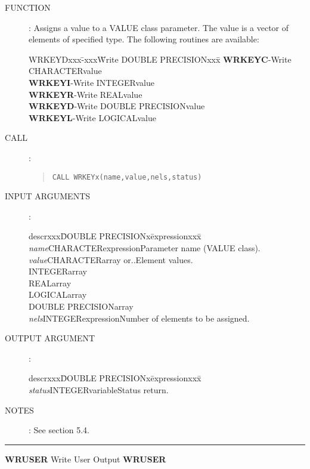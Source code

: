 \begin{description}
\item [FUNCTION]:
Assigns a value to a VALUE class parameter.
The value is a vector of elements of specified type.
The following routines are available:
\begin{center}
\begin{tabbing}
WRKEYDxxx\=-xxx\=Write DOUBLE PRECISIONxxx\=\kill
{\bf WRKEYC}\>-\>Write CHARACTER\>value\\
{\bf WRKEYI}\>-\>Write INTEGER\>value\\
{\bf WRKEYR}\>-\>Write REAL\>value\\
{\bf WRKEYD}\>-\>Write DOUBLE PRECISION\>value\\
{\bf WRKEYL}\>-\>Write LOGICAL\>value
\end{tabbing}
\end{center}
\item [CALL]:
\begin{quote}
{\tt CALL WRKEYx(name,value,nels,status)}
\end{quote}
\item [INPUT ARGUMENTS]:
\begin{tabbing}
descrxxx\=DOUBLE PRECISIONx\=expressionxxx\=\kill
{\em name}\>CHARACTER\>expression\>Parameter name (VALUE class).\\
{\em value}\>CHARACTER\>array or..\>Element values.\\
\>INTEGER\>array\\
\>REAL\>array\\
\>LOGICAL\>array\\
\>DOUBLE PRECISION\>array\\
{\em nels}\>INTEGER\>expression\>Number of elements to be assigned.
\end{tabbing}
\item [OUTPUT ARGUMENT]:
\begin{tabbing}
descrxxx\=DOUBLE PRECISIONx\=expressionxxx\=\kill
{\em status}\>INTEGER\>variable\>Status return.
\end{tabbing}
\item [NOTES]:
See section 5.4.
\end{description}
\rule{\textwidth}{0.3mm}
{\Large {\bf WRUSER} \hfill Write User Output \hfill {\bf WRUSER}}
